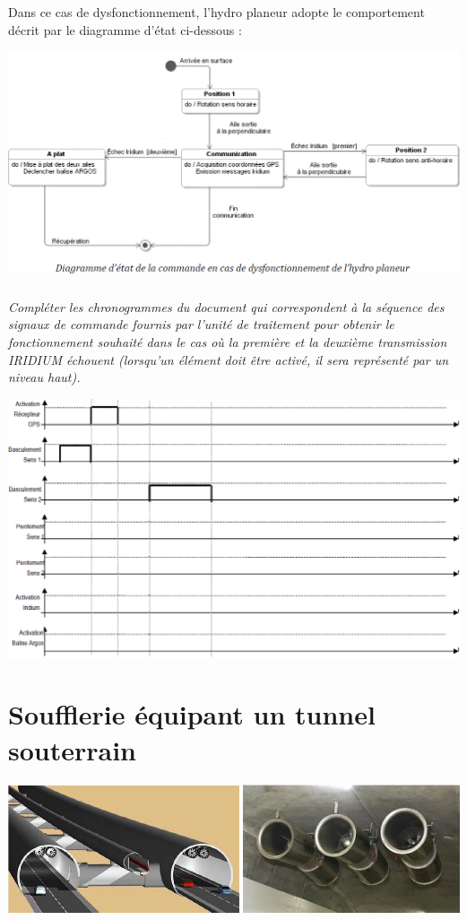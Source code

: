 \documentclass[10pt]{article}
\begin{document}
Dans ce cas de dysfonctionnement, l'hydro planeur adopte le comportement décrit par le
diagramme d'état ci-dessous :

\begin{center}
\includegraphics[width=.85\textwidth]{images/fig_06}
\end{center}

\subparagraph{}
\textit{Compléter les chronogrammes du document qui correspondent à la séquence des
signaux de commande fournis par l’unité de traitement pour obtenir le fonctionnement
souhaité dans le cas où la première et la deuxième transmission IRIDIUM échouent
(lorsqu’un élément doit être activé, il sera représenté par un niveau haut).}



\begin{center}
\includegraphics[width=.75\textwidth]{images/fig_07}
\end{center}

\section*{Soufflerie équipant un tunnel souterrain}

\begin{center}
\includegraphics[width=.95\textwidth]{images/fig_08}
\end{center}
\end{document}

